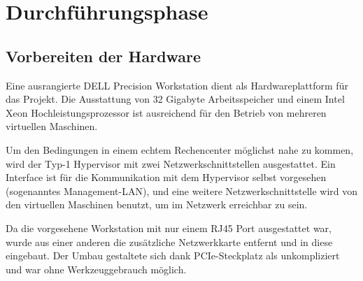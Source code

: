 \section{Durchführungsphase}
\label{sec:Durchführungsphase}

\subsection{Vorbereiten der Hardware}
\label{sec:VorbereitungHardware}
Eine ausrangierte DELL Precision Workstation dient als Hardwareplattform für das Projekt. Die Ausstattung von 32 Gigabyte Arbeitsspeicher und einem Intel Xeon Hochleistungsprozessor ist ausreichend für den Betrieb von mehreren virtuellen Maschinen.

Um den Bedingungen in einem \glqq{} echtem\grqq{} Rechencenter möglichst nahe zu kommen, wird der Typ-1 Hypervisor mit zwei Netzwerkschnittstellen ausgestattet. Ein Interface ist für die Kommunikation mit dem Hypervisor selbst vorgesehen (sogenanntes Management-LAN), und eine weitere Netzwerkschnittstelle wird von den virtuellen Maschinen benutzt, um im Netzwerk erreichbar zu sein.

Da die vorgesehene Workstation mit nur einem RJ45 Port ausgestattet war, wurde aus einer anderen die zusätzliche Netzwerkkarte entfernt und in diese eingebaut. Der Umbau gestaltete sich dank PCIe-Steckplatz als unkompliziert und war ohne Werkzeuggebrauch möglich.